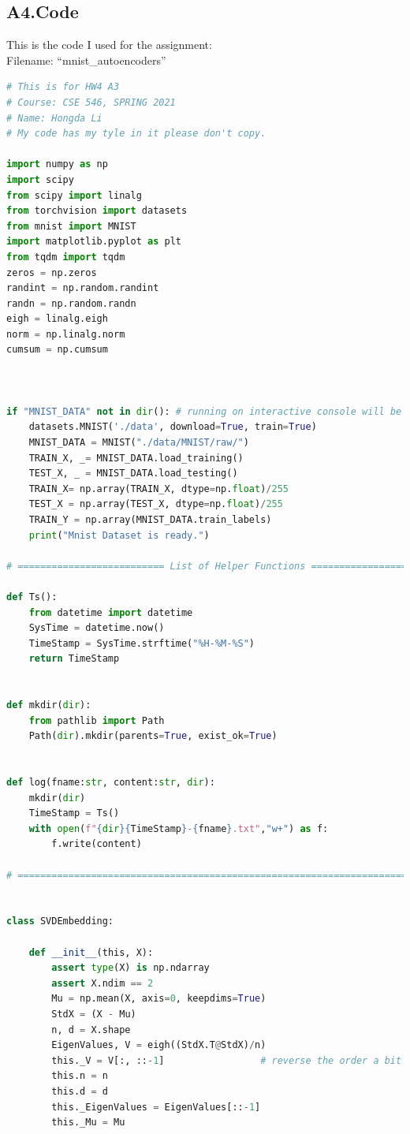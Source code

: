 \documentclass[]{article}
\begin{document}
    \subsection*{A4.Code}\label{A4.Code}
    This is the code I used for the assignment: 
    \\
    Filename: ``mnist\_autoencoders''
        \begin{lstlisting}[language=python]
# This is for HW4 A3
# Course: CSE 546, SPRING 2021
# Name: Hongda Li
# My code has my tyle in it please don't copy.

import numpy as np
import scipy
from scipy import linalg
from torchvision import datasets
from mnist import MNIST
import matplotlib.pyplot as plt
from tqdm import tqdm
zeros = np.zeros
randint = np.random.randint
randn = np.random.randn
eigh = linalg.eigh
norm = np.linalg.norm
cumsum = np.cumsum



if "MNIST_DATA" not in dir(): # running on interactive console will be faster
    datasets.MNIST('./data', download=True, train=True)
    MNIST_DATA = MNIST("./data/MNIST/raw/")
    TRAIN_X, _= MNIST_DATA.load_training()
    TEST_X, _ = MNIST_DATA.load_testing()
    TRAIN_X= np.array(TRAIN_X, dtype=np.float)/255
    TEST_X = np.array(TEST_X, dtype=np.float)/255
    TRAIN_Y = np.array(MNIST_DATA.train_labels)
    print("Mnist Dataset is ready.")

# ========================== List of Helper Functions ==========================

def Ts():
    from datetime import datetime
    SysTime = datetime.now()
    TimeStamp = SysTime.strftime("%H-%M-%S")
    return TimeStamp


def mkdir(dir):
    from pathlib import Path
    Path(dir).mkdir(parents=True, exist_ok=True)


def log(fname:str, content:str, dir):
    mkdir(dir)
    TimeStamp = Ts()
    with open(f"{dir}{TimeStamp}-{fname}.txt","w+") as f:
        f.write(content)

# ==============================================================================


class SVDEmbedding:

    def __init__(this, X):
        assert type(X) is np.ndarray
        assert X.ndim == 2
        Mu = np.mean(X, axis=0, keepdims=True)
        StdX = (X - Mu)
        n, d = X.shape
        EigenValues, V = eigh((StdX.T@StdX)/n)
        this._V = V[:, ::-1]                 # reverse the order a bit
        this.n = n
        this.d = d
        this._EigenValues = EigenValues[::-1]
        this._Mu = Mu


\end{lstlisting}
\end{document}
